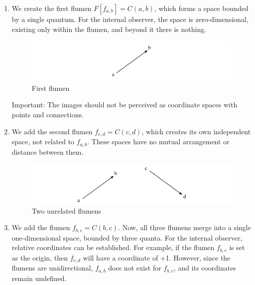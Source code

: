\documentclass[final]{article}
\begin{document}
        \begin{enumerate}

            \item We create the first flumen \( F[f_{a,b}]=C(a,b) \), which 
            forms a space bounded by a single quantum. For the internal 
            observer, the space is zero-dimensional, existing only within the 
            flumen, and beyond it there is nothing.

            \begin{figure}[H]
                \centering
                \includegraphics[width=\textwidth]{./1d-f1.png}
                \caption{First flumen}
                \label{fig:image}
            \end{figure}

            Important: The images should not be perceived as coordinate spaces 
            with points and connections.

            \item We add the second flumen \( f_{c,d}=C(c,d) \), which creates 
            its own independent space, not related to \( f_{a,b} \). These 
            spaces have no mutual arrangement or distance between them.

            \begin{figure}[H]
                \centering
                \includegraphics[width=\textwidth]{./1d-f1f2.png}
                \caption{Two unrelated flumens}
                \label{fig:image}
            \end{figure}

            \item We add the flumen \( f_{b,c}=C(b,c) \). Now, all three flumens 
            merge into a single one-dimensional space, bounded by three quanta. 
            For the internal observer, relative coordinates can be established. 
            For example, if the flumen \(f_{b,c}\) is set as the origin, then 
            \(f_{c,d}\) will have a coordinate of +1. However, since the flumens 
            are unidirectional, \(f_{a,b}\) does not exist for \(f_{b,c}\), and 
            its coordinates remain undefined.


\end{enumerate}
\end{document}
